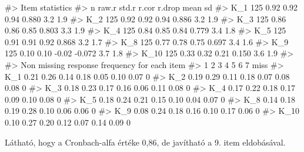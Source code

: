 \documentclass[
  letterpaper,
]{krantz}
\makeatletter
\newenvironment{Shaded}{\begin{snugshade}}{\end{snugshade}}
\newcommand{\CommentTok}[1]{\textcolor[rgb]{0.37,0.37,0.37}{#1}}
\newenvironment{kframe}{%
\medskip{}
\setlength{\fboxsep}{.8em}
 \def\at@end@of@kframe{}%
 \ifinner\ifhmode%
  \def\at@end@of@kframe{\end{minipage}}%
  \begin{minipage}{\columnwidth}%
 \fi\fi%
 \def\FrameCommand##1{\hskip\@totalleftmargin \hskip-\fboxsep
 \colorbox{shadecolor}{##1}\hskip-\fboxsep
     \hskip-\linewidth \hskip-\@totalleftmargin \hskip\columnwidth}%
 \MakeFramed {\advance\hsize-\width
   \@totalleftmargin\z@ \linewidth\hsize
   \@setminipage}}%
 {\par\unskip\endMakeFramed%
 \at@end@of@kframe}
\renewenvironment{Shaded}{\begin{kframe}}{\end{kframe}}
\makeatother
\begin{document}
\begin{Shaded}
\begin{Highlighting}[]
\CommentTok{\#\textgreater{}  Item statistics }
\CommentTok{\#\textgreater{}        n raw.r std.r r.cor r.drop mean  sd}
\CommentTok{\#\textgreater{} K\_1  125  0.92  0.92  0.94  0.880  3.2 1.9}
\CommentTok{\#\textgreater{} K\_2  125  0.92  0.92  0.94  0.886  3.2 1.9}
\CommentTok{\#\textgreater{} K\_3  125  0.86  0.86  0.85  0.803  3.3 1.9}
\CommentTok{\#\textgreater{} K\_4  125  0.84  0.85  0.84  0.779  3.4 1.8}
\CommentTok{\#\textgreater{} K\_5  125  0.91  0.91  0.92  0.868  3.2 1.7}
\CommentTok{\#\textgreater{} K\_8  125  0.77  0.78  0.75  0.697  3.4 1.6}
\CommentTok{\#\textgreater{} K\_9  125  0.10  0.10 {-}0.02 {-}0.072  3.7 1.8}
\CommentTok{\#\textgreater{} K\_10 125  0.33  0.32  0.21  0.150  3.6 1.9}
\CommentTok{\#\textgreater{} }
\CommentTok{\#\textgreater{} Non missing response frequency for each item}
\CommentTok{\#\textgreater{}         1    2    3    4    5    6    7 miss}
\CommentTok{\#\textgreater{} K\_1  0.21 0.26 0.14 0.18 0.05 0.10 0.07    0}
\CommentTok{\#\textgreater{} K\_2  0.19 0.29 0.11 0.18 0.07 0.08 0.08    0}
\CommentTok{\#\textgreater{} K\_3  0.18 0.23 0.17 0.16 0.06 0.11 0.08    0}
\CommentTok{\#\textgreater{} K\_4  0.17 0.22 0.18 0.17 0.09 0.10 0.08    0}
\CommentTok{\#\textgreater{} K\_5  0.18 0.24 0.21 0.15 0.10 0.04 0.07    0}
\CommentTok{\#\textgreater{} K\_8  0.14 0.18 0.19 0.28 0.10 0.06 0.06    0}
\CommentTok{\#\textgreater{} K\_9  0.08 0.24 0.18 0.16 0.10 0.17 0.06    0}
\CommentTok{\#\textgreater{} K\_10 0.10 0.27 0.20 0.12 0.07 0.14 0.09    0}
\end{Highlighting}
\end{Shaded}

Látható, hogy a Cronbach-alfa értéke 0,86, de javítható a 9. item
eldobásával.
\end{document}
